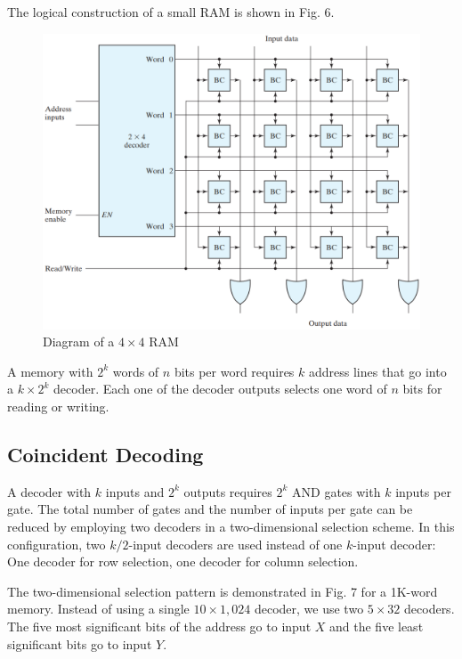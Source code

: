 \noindent The logical construction of a small RAM is shown in Fig. 6.
\begin{figure}[H]
  \centering
  \includegraphics[width=\linewidth]{img/fig-7.6.png}
  \caption{Diagram of a $4 \times 4$ RAM}
  \label{fig:7.6}
\end{figure}

A memory with $2^k$ words of $n$ bits per word requires $k$ address lines that go into a $k \times 2^k$ decoder. Each one of the decoder outputs selects one word of $n$ bits for reading or writing.

\subsection{Coincident Decoding}
\label{subsec:coincident-decoding}

A decoder with $k$ inputs and $2^k$ outputs requires $2^k$ AND gates with $k$ inputs per gate. The total number of gates and the number of inputs per gate can be reduced by employing two decoders in a two-dimensional selection scheme. In this configuration, two $k/2$-input decoders are used instead of one $k$-input decoder: One decoder for row selection, one decoder for column selection.

The two-dimensional selection pattern is demonstrated in Fig. 7 for a 1K-word memory. Instead of using a single $10 \times 1,024$ decoder, we use two $5 \times 32$ decoders. The five most significant bits of the address go to input $X$ and the five least significant bits go to input $Y$.

